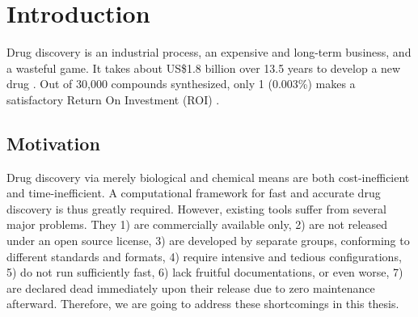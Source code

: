 \chapter{Introduction}

Drug discovery is an industrial process, an expensive and long-term business, and a wasteful game. It takes about US\$1.8 billion over 13.5 years to develop a new drug \citep{716}. Out of 30,000 compounds synthesized, only 1 (0.003\%) makes a satisfactory Return On Investment (ROI) \citep{713}. %

\section{Motivation}

Drug discovery via merely biological and chemical means are both cost-inefficient and time-inefficient. A computational framework for fast and accurate drug discovery is thus greatly required. However, existing tools suffer from several major problems. They 1) are commercially available only, 2) are not released under an open source license, 3) are developed by separate groups, conforming to different standards and formats, 4) require intensive and tedious configurations, 5) do not run sufficiently fast, 6) lack fruitful documentations, or even worse, 7) are declared dead immediately upon their release due to zero maintenance afterward. Therefore, we are going to address these shortcomings in this thesis.

